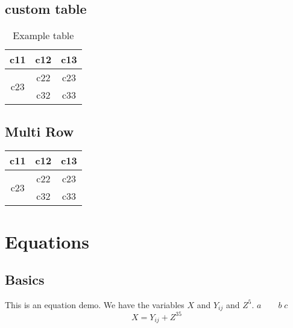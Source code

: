 \documentclass{article}
\begin{document}
    \subsection{custom table}
    \begin{table}[H]
        \centering
       \begin{tabular}{|c|c|c|}
                \hline
                c11 & c12 & c13 \\
                 \hline
                \multirow{2}{*}{c23} & c22 & c23 \\
                \cline{2-3}
                 & c32 & c33 \\
                \hline
            \end{tabular}
        \caption{Example table}
        \label{tab:table1}
            
    \end{table}
    \subsection{Multi Row}
        \begin{tabular}{|c|c|c|}
            \hline
            c11 & c12 & c13 \\
             \hline
            \multirow{2}{*}{c23} & c22 & c23 \\
            \cline{2-3}
             & c32 & c33 \\
            \hline
        \end{tabular}
\section{Equations}
    \subsection{Basics}
    This is an equation demo. We have the variables $X$ and $Y_{ij}$ and $Z^{5}$. $a \qquad b \; c$
        \begin{equation}
            X = Y_{ij} + Z^{35}
        \end{equation}
        
\end{document}
